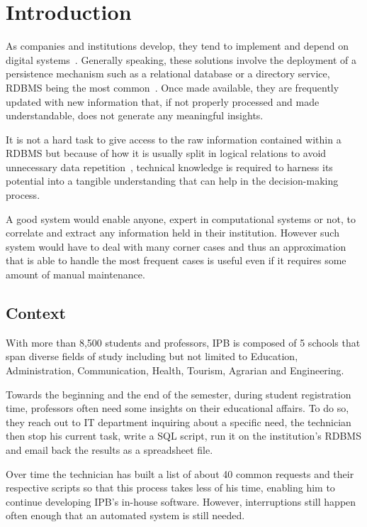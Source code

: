\chapter{Introduction}\label{chapter:intro}
As companies and institutions develop, they tend to implement and depend on digital systems~\cite{ibm}. Generally speaking, these solutions involve the deployment of a persistence mechanism such as a relational database or a directory service, \gls{RDBMS} being the most common~\cite{apachedp}. Once  made available, they are frequently updated with new information that, if not properly processed and made understandable, does not generate any meaningful insights.

It is not a hard task to give access to the raw information contained within a \gls{RDBMS} but because of how it is usually split in logical relations to avoid unnecessary data repetition~\cite[Part~$\mathrm{V}$]{vaquinha}, technical knowledge is required to harness its potential into a tangible understanding that can help in the decision-making process. 

A good system would enable anyone, expert in computational systems or not, to correlate and extract any information held in their institution. However such system would have to deal with many corner cases and thus an approximation that is able to handle the most frequent cases is useful even if it requires some amount of manual maintenance.

\section{Context}\label{context}
With more than 8,500 students and professors, \gls{IPB} is composed of 5 schools that span diverse fields of study including but not limited to Education, Administration, Communication, Health, Tourism, Agrarian and Engineering.

Towards the beginning and the end of the semester, during student registration time, professors often need some insights on their educational affairs. To do so, they reach out to \gls{IT} department inquiring about a specific need, the technician then stop his current task, write a \gls{SQL} script, run it on the institution's \gls{RDBMS} and email back the results as a spreadsheet file.

Over time the technician has built a list of about 40 common requests and their respective scripts so that this process takes less of his time, enabling him to continue developing \gls{IPB}'s in-house software. However, interruptions still happen often enough that an automated system is still needed.

